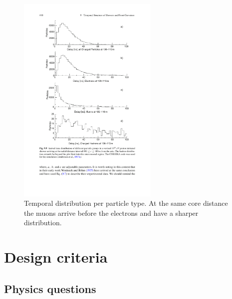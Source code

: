 \begin{figure}
    \centering
    \includegraphics[width=0.6\textwidth]
                    {plots/cosmic-rays/temporal_per_particle}
    \caption{Temporal distribution per particle type. At the same core distance the muons arrive before the electrons and have a sharper distribution. \cite{grieder2010eas}}
    \label{fig:temporal_per_particle}
\end{figure}

%
%
%
%

\section{Design criteria}

\subsection{Physics questions}

